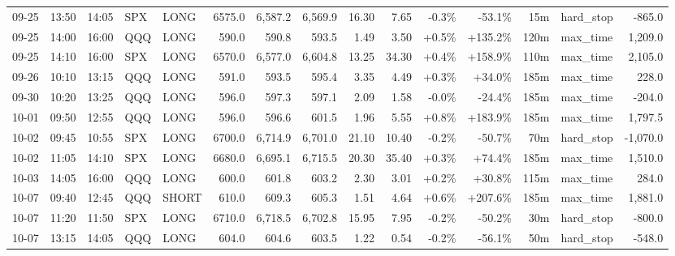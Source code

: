 \documentclass[11pt,a4paper,twoside]{article}
\begin{document}
\begin{landscape}
\begin{center}
\begin{longtable}{>{\color{txtmain}}l l l l l r r r r r r r r >{\color{txtmain}}l r}
09-25 & 13:50 & 14:05 & SPX & LONG & 6575.0 & 6,587.2 & 6,569.9 & 16.30 & 7.65 & \textcolor{lossred}{-0.3\%} & \textcolor{lossred}{-53.1\%} & 15m & hard\_stop & \textcolor{lossred}{-865.0} \\
09-25 & 14:00 & 16:00 & QQQ & LONG & 590.0 & 590.8 & 593.5 & 1.49 & 3.50 & \textcolor{wingreen}{+0.5\%} & \textcolor{wingreen}{+135.2\%} & 120m & max\_time & \textcolor{wingreen}{1,209.0} \\
09-25 & 14:10 & 16:00 & SPX & LONG & 6570.0 & 6,577.0 & 6,604.8 & 13.25 & 34.30 & \textcolor{wingreen}{+0.4\%} & \textcolor{wingreen}{+158.9\%} & 110m & max\_time & \textcolor{wingreen}{2,105.0} \\
09-26 & 10:10 & 13:15 & QQQ & LONG & 591.0 & 593.5 & 595.4 & 3.35 & 4.49 & \textcolor{wingreen}{+0.3\%} & \textcolor{wingreen}{+34.0\%} & 185m & max\_time & \textcolor{wingreen}{228.0} \\
09-30 & 10:20 & 13:25 & QQQ & LONG & 596.0 & 597.3 & 597.1 & 2.09 & 1.58 & \textcolor{lossred}{-0.0\%} & \textcolor{lossred}{-24.4\%} & 185m & max\_time & \textcolor{lossred}{-204.0} \\
10-01 & 09:50 & 12:55 & QQQ & LONG & 596.0 & 596.6 & 601.5 & 1.96 & 5.55 & \textcolor{wingreen}{+0.8\%} & \textcolor{wingreen}{+183.9\%} & 185m & max\_time & \textcolor{wingreen}{1,797.5} \\
10-02 & 09:45 & 10:55 & SPX & LONG & 6700.0 & 6,714.9 & 6,701.0 & 21.10 & 10.40 & \textcolor{lossred}{-0.2\%} & \textcolor{lossred}{-50.7\%} & 70m & hard\_stop & \textcolor{lossred}{-1,070.0} \\
10-02 & 11:05 & 14:10 & SPX & LONG & 6680.0 & 6,695.1 & 6,715.5 & 20.30 & 35.40 & \textcolor{wingreen}{+0.3\%} & \textcolor{wingreen}{+74.4\%} & 185m & max\_time & \textcolor{wingreen}{1,510.0} \\
10-03 & 14:05 & 16:00 & QQQ & LONG & 600.0 & 601.8 & 603.2 & 2.30 & 3.01 & \textcolor{wingreen}{+0.2\%} & \textcolor{wingreen}{+30.8\%} & 115m & max\_time & \textcolor{wingreen}{284.0} \\
10-07 & 09:40 & 12:45 & QQQ & SHORT & 610.0 & 609.3 & 605.3 & 1.51 & 4.64 & \textcolor{wingreen}{+0.6\%} & \textcolor{wingreen}{+207.6\%} & 185m & max\_time & \textcolor{wingreen}{1,881.0} \\
10-07 & 11:20 & 11:50 & SPX & LONG & 6710.0 & 6,718.5 & 6,702.8 & 15.95 & 7.95 & \textcolor{lossred}{-0.2\%} & \textcolor{lossred}{-50.2\%} & 30m & hard\_stop & \textcolor{lossred}{-800.0} \\
10-07 & 13:15 & 14:05 & QQQ & LONG & 604.0 & 604.6 & 603.5 & 1.22 & 0.54 & \textcolor{lossred}{-0.2\%} & \textcolor{lossred}{-56.1\%} & 50m & hard\_stop & \textcolor{lossred}{-548.0} \\

\end{longtable}
\end{center}
\end{landscape}
\end{document}
